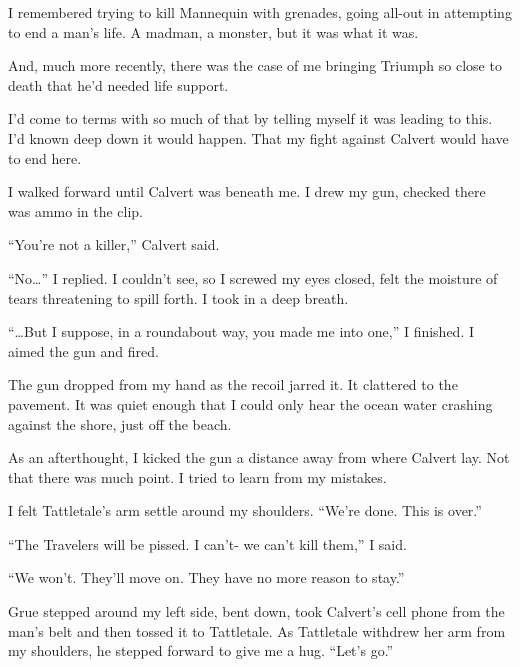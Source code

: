 I remembered trying to kill Mannequin with grenades, going all-out in attempting to end a man's life.  A madman, a monster, but it was what it was.



And, much more recently, there was the case of me bringing Triumph so close to death that he'd needed life support.



I'd come to terms with so much of that by telling myself it was leading to this.  I'd known deep down it would happen.  That my fight against Calvert would have to end here.



I walked forward until Calvert was beneath me.  I drew my gun, checked there was ammo in the clip.



``You're not a killer,'' Calvert said.



``No\ldots'' I replied.  I couldn't see, so I screwed my eyes closed, felt the moisture of tears threatening to spill forth.  I took in a deep breath.



``\ldots{}But I suppose, in a roundabout way, you made me into one,'' I finished.  I aimed the gun and fired.



The gun dropped from my hand as the recoil jarred it.  It clattered to the pavement.  It was quiet enough that I could only hear the ocean water crashing against the shore, just off the beach.



As an afterthought, I kicked the gun a distance away from where Calvert lay.  Not that there was much point.  I tried to learn from my mistakes.



I felt Tattletale's arm settle around my shoulders.  ``We're done.  This is over.''



``The Travelers will be pissed.  I can't- we can't kill them,'' I said.



``We won't.  They'll move on.  They have no more reason to stay.''



Grue stepped around my left side, bent down, took Calvert's cell phone from the man's belt and then tossed it to Tattletale.  As Tattletale withdrew her arm from my shoulders, he stepped forward to give me a hug.  ``Let's go.''



